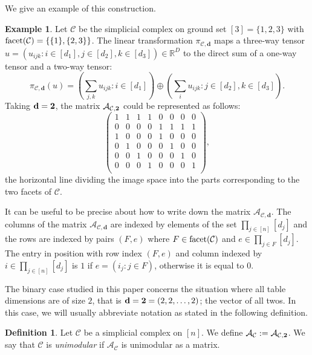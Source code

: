\documentclass[letterpaper,12pt]{amsart}
\theoremstyle{plain}
\theoremstyle{definition}
\newtheorem{defn}[thm]{Definition}
\newtheorem{ex}[thm]{Example}
\theoremstyle{remark}
\newcommand{\rr}{\mathbb{R}}
\newcommand{\bfd}{\mathbf{d}}
\newcommand{\calc}{\mathcal{C}}
\begin{document}
We give an example of this construction.

\begin{ex}		
Let $\calc$ be the simplicial complex on ground set $[3] = \{1,2,3\}$ with
${\rm facet}(\calc) =  \{ \{1\}, \{2,3\} \}$.
The linear transformation $\pi_{\calc, \bfd}$
maps a three-way tensor $u = (u_{ijk} : i \in [d_1], j \in [d_2], k \in [d_3] ) \in \rr^D$
to the direct sum of a one-way tensor and a two-way tensor:
$$
\pi_{\calc, \bfd}( u)  =    ( \sum_{j,k}  u_{ijk} :  i \in [d_1])  \oplus 
( \sum_{i}  u_{ijk} :  j \in [d_2], k \in [d_3]). 
$$
Taking $\bfd = {\bf 2}$, the matrix $\mathcal{A}_{\calc, {\bf 2}}$ could be represented
as follows:
$$
\begin{pmatrix}
1 & 1 & 1 & 1 & 0 & 0 & 0 & 0 \\
0 & 0 & 0 & 0 & 1 & 1 & 1 & 1 \\
\hline
1 & 0 & 0 & 0 & 1 & 0 & 0 & 0 \\
0 & 1 & 0 & 0 & 0 & 1 & 0 & 0  \\
0 & 0 & 1 & 0 & 0 & 0 & 1 & 0 \\
0 & 0 & 0 & 1 & 0 & 0 & 0 & 1  \\
\end{pmatrix},
$$
the horizontal line dividing the image space into the parts corresponding
to the two facets of $\calc$.
\end{ex}

It can be useful to be precise about how to write down the matrix
$\mathcal{A}_{\calc, \bfd}$.  The columns of the matrix
$\mathcal{A}_{\calc, \bfd}$ are indexed by elements of the set
$\prod_{j \in [n]}  [d_j]$ and the rows are indexed by pairs
$(F, e)$ where $F \in {\rm facet}(\calc)$ and $e \in \prod_{j \in F}  [d_j]$.
The entry in position with row index $(F, e)$ and column indexed by $i \in \prod_{j \in [n]}  [d_j]$ is $1$ if $e  =  (i_j :  j \in F)$, otherwise it is equal to
$0$.

The binary case studied in this paper concerns the situation where
all table dimensions are of size $2$, that is $\bfd = {\bf 2} = (2,2,\dots,2)$; the vector of all twos.
In this case, we will usually abbreviate notation as stated in the following definition.

\begin{defn}
	Let $\mathcal{C}$ be a simplicial complex on $[n]$.
	We define $\mathcal{A}_{\calc} := \mathcal{A}_{\calc,{\bf 2}}$.
	We say that $\mathcal{C}$ is \emph{unimodular} if $\mathcal{A}_\calc$ is unimodular as a matrix.
\end{defn}
\end{document}
